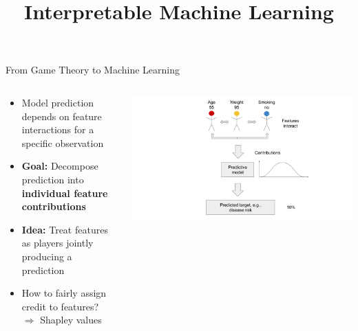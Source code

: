 \documentclass[10pt,compress,t,notes=noshow, xcolor=table]{beamer}
\title{Interpretable Machine Learning}
\date{}
\begin{document}






\begin{frame}{From Game Theory to Machine Learning}

\begin{columns}[T,onlytextwidth]
\begin{column}{0.55\textwidth}
\begin{itemize}
    \item Model prediction depends on feature interactions for a specific observation
  \item \textbf{Goal:} Decompose prediction into \textbf{individual feature contributions}
  \item \textbf{Idea:} Treat features as players jointly producing a prediction
  \item How to fairly assign credit to features?\\
  $\Rightarrow$ Shapley values %
\end{itemize}
\end{column}

\begin{column}{0.45\textwidth}
  \includegraphics[width=\linewidth, trim=300px 0px 200px 0px, clip]{figure/Shapley_6.png}
\end{column}
\end{columns}

\end{frame}
\end{document}
